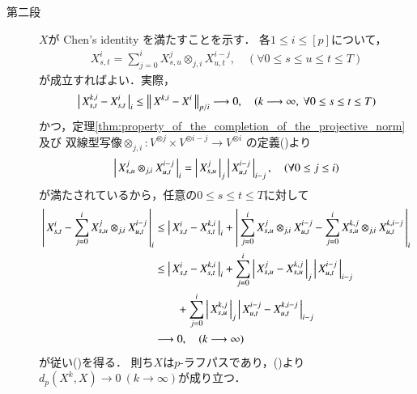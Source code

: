 \begin{prf}
\begin{description}
		\item[第二段] $X$が Chen's identity を満たすことを示す．
			各$1 \leq i \leq [p]$について，
			\begin{align}
				X^i_{s,t} = \sum_{j=0}^i X^j_{s,u} \otimes_{j,i} X^{i-j}_{u,t},
				\quad (\forall 0 \leq s \leq u \leq t \leq T)
				\label{eq:thm_p_rough_path_complete_dist_1}
			\end{align}
			が成立すればよい．実際，
			\begin{align}
				\left|\, X^{k,i}_{s,t} - X^i_{s,t}\, \right|_{i}
				\leq \left\|\, X^{k,i} - X^i\, \right\|_{p/i} \longrightarrow 0,
				\quad (k \longrightarrow \infty,\ \forall 0 \leq s \leq t \leq T)
			\end{align}
			かつ，定理\ref{thm:property_of_the_completion_of_the_projective_norm}及び
			双線型写像$\otimes_{j,i}:V^{\otimes j} \times V^{\otimes i-j} 
			\longrightarrow V^{\otimes i}$
			の定義()より
			\begin{align}
				\left|\, X^j_{s,u} \otimes_{j,i} X^{i-j}_{u,t}\, \right|_{i}
				= \left|\, X^j_{s,u}\, \right|_{j} \left|\, X^{i-j}_{u,t}\, \right|_{i-j},
				\quad (\forall 0 \leq j \leq i)
			\end{align}
			が満たされているから，任意の$0 \leq s \leq t \leq T$に対して
			\begin{align}
				\left|\, X^i_{s,t} - \sum_{j=0}^i X^j_{s,u} \otimes_{j,i} X^{i-j}_{u,t}\, \right|_{i}
				&\leq \left|\, X^i_{s,t} - X^{k,i}_{s,t}\, \right|_{i}
					+ \left|\, \sum_{j=0}^i X^j_{s,u} \otimes_{j,i} X^{i-j}_{u,t} 
					- \sum_{j=0}^i X^{k,j}_{s,u} \otimes_{j,i} X^{k,i-j}_{u,t}\, \right|_{i} \\
				&\leq \left|\, X^i_{s,t} - X^{k,i}_{s,t}\, \right|_{i}
					+ \sum_{j=0}^i \left|\, X^j_{s,u} - X^{k,j}_{s,u}\, \right|_{j}
						\left|\, X^{i-j}_{u,t}\, \right|_{i-j} \\
					&\qquad + \sum_{j=0}^i \left|\, X^{k,j}_{s,u}\, \right|_{j}
						\left|\, X^{i-j}_{u,t} - X^{k,i-j}_{u,t}\, \right|_{i-j} \\
				&\longrightarrow 0,
				\quad (k \longrightarrow \infty)
			\end{align}
			が従い()を得る．
			則ち$X$は$p$-ラフパスであり，()より
			$d_p(X^k,X) \longrightarrow 0\ (k \longrightarrow \infty)$が成り立つ．
			\QED
	\end{description}
\end{prf}